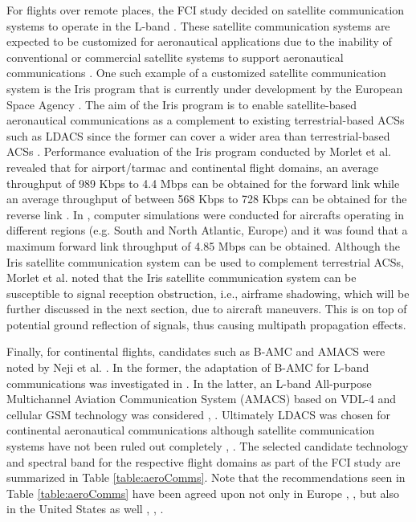 For flights over remote places, the FCI study decided on satellite communication systems to operate in the L-band \cite{neji2013survey,morlet2011options}. These satellite communication systems are expected to be customized for aeronautical applications due to the inability of conventional or commercial satellite systems to support aeronautical communications \cite{neji2013survey}. One such example of a customized satellite communication system is the Iris program that is currently under development by the European Space Agency \cite{morlet2011options,morlet2010characterisation}. The aim of the Iris program is to enable satellite-based aeronautical communications as a complement to existing terrestrial-based ACSs such as LDACS since the former can cover a wider area than terrestrial-based ACSs \cite{morlet2011options}. Performance evaluation of the Iris program conducted by Morlet et al. \cite{morlet2010characterisation} revealed that for airport/tarmac and continental flight domains, an average throughput of 989 Kbps to 4.4 Mbps can be obtained for the forward link while an average throughput of between 568 Kbps to 728 Kbps can be obtained for the reverse link \cite{morlet2010characterisation}. In \cite{morlet2011options}, computer simulations were conducted for aircrafts operating in different regions (e.g. South and North Atlantic, Europe) and it was found that a maximum forward link throughput of 4.85 Mbps can be obtained. Although the Iris satellite communication system can be used to complement terrestrial ACSs, Morlet et al. \cite{morlet2011options} noted that the Iris satellite communication system can be susceptible to signal reception obstruction, i.e., airframe shadowing, which will be further discussed in the next section, due to aircraft maneuvers. This is on top of potential ground reflection of signals, thus causing multipath propagation effects.

Finally, for continental flights, candidates such as B-AMC and AMACS were noted by Neji et al. \cite{neji2013survey}. In the former, the adaptation of B-AMC for L-band communications was investigated in \cite{rokitansky2007bamc}. In the latter, an L-band All-purpose Multichannel Aviation Communication System (AMACS) based on VDL-4 and cellular GSM technology was considered \cite{eurocontrol2007amacs}, \cite{deneufchatel2007all}. Ultimately LDACS was chosen for continental aeronautical communications although satellite communication systems have not been ruled out completely \cite{neji2013survey}, \cite{fistas2009future}. The selected candidate technology and spectral band for the respective flight domains as part of the FCI study are summarized in Table \ref{table:aeroComms}. Note that the recommendations seen in Table \ref{table:aeroComms} have been agreed upon not only in Europe \cite{budinger2011aeronautical}, \cite{fistas2009future}, \cite{fistas2011future} but also in the United States as well \cite{wichgers2013study}, \cite{budinger2011aeronautical}, \cite{budinger2005technology}. 

